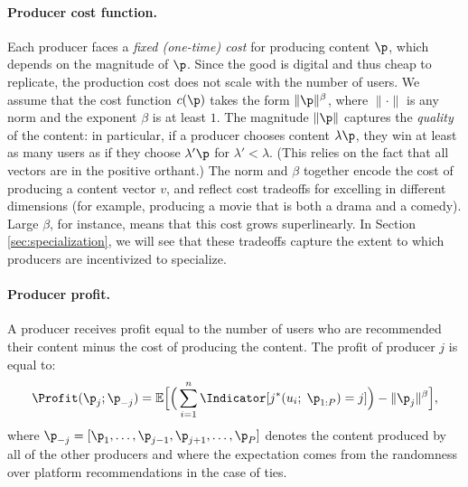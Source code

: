 \documentclass[10pt]{article}
\begin{document}
\begin{ReviewVerbatim}
\paragraph{Producer cost function.} Each producer faces a \textit{fixed (one-time) cost} for producing content $\p$, which depends on the magnitude of $\p$. Since the good is digital and thus cheap to replicate, the production cost does not scale with the number of users.
We assume that the cost function $c(\p)$ takes the form $\|\p\|^{\beta}$, where $\|\cdot\|$ is any norm and the exponent $\beta$ is at least $1$. The magnitude $\|\p\|$ captures the \textit{quality} of the content: in particular, if a producer chooses content $\lambda \p$, they win at least as many users as if they choose $\lambda' \p$ for $\lambda' < \lambda$. (This relies on the fact that all vectors are in the positive orthant.) The norm and $\beta$ together encode the cost of producing a content vector $v$, and reflect cost tradeoffs for excelling in different dimensions (for example, producing a movie that is both a drama and a comedy). Large $\beta$, for instance, means that this cost grows superlinearly. In Section \ref{sec:specialization}, we will see that these tradeoffs capture the extent to which producers are incentivized to specialize.


\paragraph{Producer profit.} A producer receives profit equal to the number of users who are recommended their content minus the cost of producing the content. The profit of producer $j$ is equal to:
\begin{equation}
\label{eq:utility}
 \Profit(\p_j; \p_{-j}) =  \mathbb{E}\Big[ \Big(\sum_{i=1}^n \Indicator[j^*(u_i;\; \p_{1:P}) = j]\Big) - \|\p_j\|^{\beta}  \Big],
\end{equation}
where
$\p_{-j} = [\p_1, \ldots, \p_{j-1}, \p_{j+1}, \ldots, \p_P]$ denotes the content produced by all of the other producers and
where the expectation comes from the randomness over platform recommendations in the case of ties.
\end{ReviewVerbatim}
\end{document}
